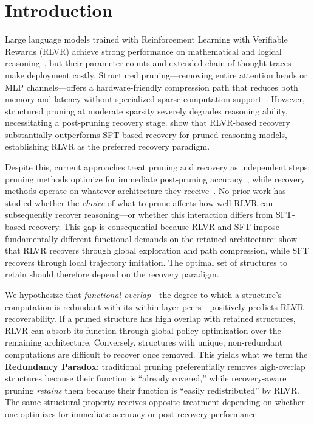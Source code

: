 \section{Introduction}
\label{sec:intro}

Large language models trained with Reinforcement Learning with Verifiable Rewards (RLVR) achieve strong performance on mathematical and logical reasoning~\citep{deepseek2025r1,shao2024grpo}, but their parameter counts and extended chain-of-thought traces make deployment costly.
Structured pruning---removing entire attention heads or MLP channels---offers a hardware-friendly compression path that reduces both memory and latency without specialized sparse-computation support~\citep{llmpruner2023,graspprune2026}.
However, structured pruning at moderate sparsity severely degrades reasoning ability, necessitating a post-pruning recovery stage.
\citet{selfhealing2025} show that RLVR-based recovery substantially outperforms SFT-based recovery for pruned reasoning models, establishing RLVR as the preferred recovery paradigm.

Despite this, current approaches treat pruning and recovery as independent steps: pruning methods optimize for immediate post-pruning accuracy~\citep{resp2025,graspprune2026,bonsai2025}, while recovery methods operate on whatever architecture they receive~\citep{selfhealing2025,paser2025}.
No prior work has studied whether the \emph{choice} of what to prune affects how well RLVR can subsequently recover reasoning---or whether this interaction differs from SFT-based recovery.
This gap is consequential because RLVR and SFT impose fundamentally different functional demands on the retained architecture: \citet{rlsqueezes2026} show that RLVR recovers through global exploration and path compression, while SFT recovers through local trajectory imitation.
The optimal set of structures to retain should therefore depend on the recovery paradigm.

We hypothesize that \emph{functional overlap}---the degree to which a structure's computation is redundant with its within-layer peers---positively predicts RLVR recoverability.
If a pruned structure has high overlap with retained structures, RLVR can absorb its function through global policy optimization over the remaining architecture.
Conversely, structures with unique, non-redundant computations are difficult to recover once removed.
This yields what we term the \textbf{Redundancy Paradox}: traditional pruning preferentially removes high-overlap structures because their function is ``already covered,'' while recovery-aware pruning \emph{retains} them because their function is ``easily redistributed'' by RLVR.
The same structural property receives opposite treatment depending on whether one optimizes for immediate accuracy or post-recovery performance.

